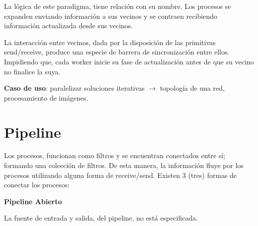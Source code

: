 \documentclass[a4paper, 10pt]{report}
\begin{document}
La lógica de este paradigma, tiene relación con su nombre. Los procesos se expanden enviando información a sus vecinos y se contraen recibiendo información actualizada desde sus vecinos.

La interacción entre vecinos, dada por la disposición de las primitivas send/receive, produce una especie de barrera de sincronización entre ellos. Impidiendo que, cada worker inicie su fase de actualización antes de que su vecino no finalice la suya.

\textbf{Caso de uso}: paralelizar soluciones iterativas $\rightarrow$ topología de una red, procesamiento de imágenes.

\section{Pipeline}

Los procesos, funcionan como filtros y se encuentran conectados entre sí; formando una colección de filtros. De esta manera, la información fluye por los procesos utilizando alguna forma de receive/send. Existen 3 (tres) formas de conectar los procesos:

\begin{multicols}{2}

\textbf{Pipeline Abierto}

La fuente de entrada y salida, del pipeline, no está especificada.

\columnbreak
{}
\end{multicols}
\end{document}
